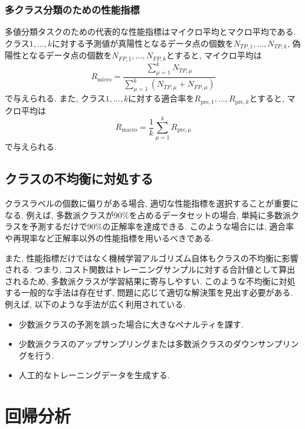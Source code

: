 \documentclass[uplatex]{jsarticle}
\theoremstyle{definition}
\numberwithin{equation}{section}
\begin{document}
\subsubsection{多クラス分類のための性能指標}
多値分類タスクのための代表的な性能指標はマイクロ平均とマクロ平均である.
クラス$1, \dots, k$に対する予測値が真陽性となるデータ点の個数を$N_{TP, 1}, \dots, N_{TP, k}$, 偽陽性となるデータ点の個数を$N_{FP, 1}, \dots, N_{FP, k}$とすると, マイクロ平均は
\begin{equation}
    R_{\mathrm{micro}} = \frac{\sum_{\mu = 1}^{k} N_{TP, \mu}}{\sum_{\mu = 1}^{k} (N_{TP, \mu} + N_{FP, \mu})}
\end{equation}
で与えられる.
また, クラス$1, \dots, k$に対する適合率を$R_{\mathrm{pre}, 1}, \dots, R_{\mathrm{pre}, k}$とすると, マクロ平均は
\begin{equation}
    R_{\mathrm{macro}} = \frac{1}{k}\sum_{\mu = 1}^{k} R_{\mathrm{pre, \mu}}
\end{equation}
で与えられる.

\subsection{クラスの不均衡に対処する}
クラスラベルの個数に偏りがある場合, 適切な性能指標を選択することが重要になる.
例えば, 多数派クラスが90\%を占めるデータセットの場合, 単純に多数派クラスを予測するだけで90\%の正解率を達成できる.
このような場合には, 適合率や再現率など正解率以外の性能指標を用いるべきである.

また, 性能指標だけではなく機械学習アルゴリズム自体もクラスの不均衡に影響される.
つまり, コスト関数はトレーニングサンプルに対する合計値として算出されるため, 多数派クラスが学習結果に寄与しやすい.
このような不均衡に対処する一般的な手法は存在せず, 問題に応じて適切な解決策を見出す必要がある.
例えば, 以下のような手法が広く利用されている.
\begin{itemize}
    \item
    少数派クラスの予測を誤った場合に大きなペナルティを課す.

    \item
    少数派クラスのアップサンプリングまたは多数派クラスのダウンサンプリングを行う.

    \item
    人工的なトレーニングデータを生成する.
\end{itemize}


\section{回帰分析}
\end{document}
